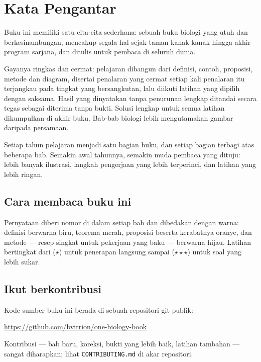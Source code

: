 \chapter{Kata Pengantar}

Buku ini memiliki satu cita-cita sederhana: sebuah buku biologi yang utuh
dan berkesinambungan, mencakup segala hal sejak taman kanak-kanak hingga
akhir program sarjana, dan ditulis untuk pembaca di seluruh dunia.

Gayanya ringkas dan cermat: pelajaran dibangun dari definisi, contoh,
proposisi, metode dan diagram, disertai penalaran yang cermat setiap kali
penalaran itu terjangkau pada tingkat yang bersangkutan, lalu diikuti latihan
yang dipilih dengan saksama. Hasil yang dinyatakan tanpa penurunan lengkap
ditandai secara tegas sebagai diterima tanpa bukti. Solusi lengkap untuk semua
latihan dikumpulkan di akhir buku. Bab-bab biologi lebih mengutamakan gambar
daripada persamaan.

Setiap tahun pelajaran menjadi satu bagian buku, dan setiap bagian
terbagi atas beberapa bab. Semakin awal tahunnya, semakin muda pembaca
yang dituju: lebih banyak ilustrasi, langkah pengerjaan yang lebih
terperinci, dan latihan yang lebih ringan.

\section*{Cara membaca buku ini}

Pernyataan diberi nomor di dalam setiap bab dan dibedakan dengan warna:
definisi berwarna biru, teorema merah, proposisi beserta kerabatnya
oranye, dan metode --- resep singkat untuk pekerjaan yang baku ---
berwarna hijau. Latihan bertingkat dari ($\star$) untuk penerapan
langsung sampai ($\star\star\star$) untuk soal yang lebih sukar.

\section*{Ikut berkontribusi}

Kode sumber buku ini berada di sebuah repositori git publik:
\begin{center}
\url{https://github.com/bvirrion/one-biology-book}
\end{center}
Kontribusi --- bab baru, koreksi, bukti yang lebih baik, latihan
tambahan --- sangat diharapkan; lihat \texttt{CONTRIBUTING.md} di akar
repositori.

